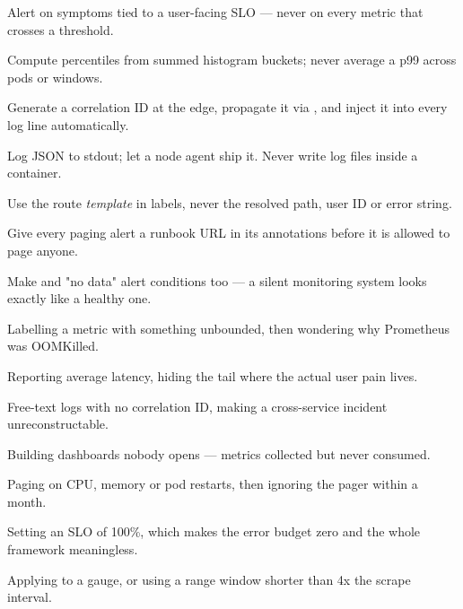 \begin{bestpractices}
\begin{wbitem}
  \item Alert on symptoms tied to a user-facing SLO --- never on every metric that crosses a threshold.
  \item Compute percentiles from summed histogram buckets; never average a p99 across pods or windows.
  \item Generate a correlation ID at the edge, propagate it via , and inject it into every log line automatically.
  \item Log JSON to stdout; let a node agent ship it. Never write log files inside a container.
  \item Use the route \emph{template} in labels, never the resolved path, user ID or error string.
  \item Give every paging alert a runbook URL in its annotations before it is allowed to page anyone.
  \item Make  and "no data" alert conditions too --- a silent monitoring system looks exactly like a healthy one.
\end{wbitem}
\end{bestpractices}
\begin{mistakes}
\begin{wbitem}
  \item Labelling a metric with something unbounded, then wondering why Prometheus was OOMKilled.
  \item Reporting average latency, hiding the tail where the actual user pain lives.
  \item Free-text logs with no correlation ID, making a cross-service incident unreconstructable.
  \item Building dashboards nobody opens --- metrics collected but never consumed.
  \item Paging on CPU, memory or pod restarts, then ignoring the pager within a month.
  \item Setting an SLO of 100\%, which makes the error budget zero and the whole framework meaningless.
  \item Applying  to a gauge, or using a range window shorter than 4x the scrape interval.
\end{wbitem}
\end{mistakes}


